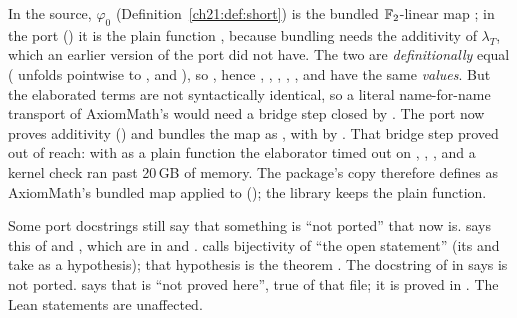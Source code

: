\begin{warning}[title={The one substantive difference: \texttt{phi0} is a function, not a bundled linear map}]
In the source, $\varphi_0$ (Definition~\ref{ch21:def:short}) is the bundled $\mathbb{F}_2$-linear map
; in the port
() it is the plain
function , because bundling needs the additivity of
$\lambda_T$, which an earlier version of the port did not have.  The two are \emph{definitionally}
equal ( unfolds pointwise to , and
), so , hence , ,
, , ,  and  have the same \emph{values}.  But the
elaborated terms are not syntactically identical, so a literal name-for-name transport of AxiomMath's
 would need a bridge step closed by .  The port now
proves additivity () and bundles the map as , with
 by .  That bridge step proved out of reach: with
 as a plain function the elaborator timed out on , , , and a kernel check ran past
20\,GB of memory.  The package's copy therefore defines  as AxiomMath's bundled map
 applied to  ();
the library keeps the plain function.
\end{warning}

\begin{warning}[title={Out-of-date port docstrings}]
Some port docstrings still say that something is ``not ported'' that now is.
 says this of  and , which are in
 and .   calls
bijectivity of  ``the open statement'' (its  and
 take  as a hypothesis); that hypothesis
is the theorem .  The docstring of  in
 says  is not ported.
 says that  is ``not proved here'', true of that file;
it is proved in .  The Lean statements are unaffected.
\end{warning}

